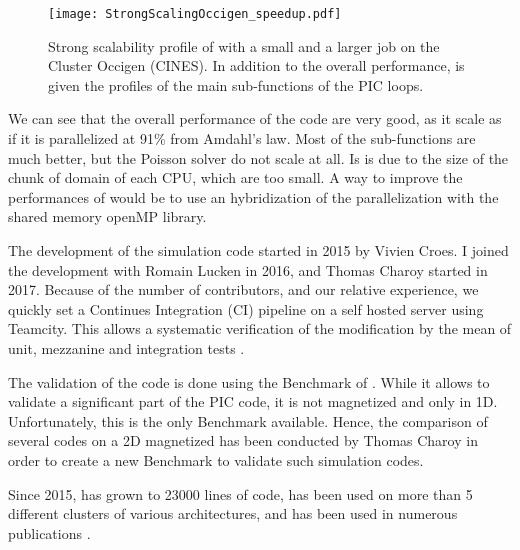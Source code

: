 \begin{figure}[hbtp]
  \centering
  \texttt{[image: StrongScalingOccigen\_speedup.pdf]}
  \caption{Strong scalability profile of \LPPic with a small and a larger job on the Cluster Occigen (CINES). In addition to the overall performance, is given the profiles of the main sub-functions of the \ac{PIC} loops. }
  \label{fig-strongperfo}
\end{figure}

We can see that the overall performance of the code are very good, as it scale as if it is parallelized at 91\% from Amdahl's law.
Most of the sub-functions are much better, but the Poisson solver do not scale at all.
Is is due to the size of the chunk of domain of each CPU, which are too small.
A way to improve the performances of \LPPic would be to use an hybridization of the parallelization with the shared memory openMP library.

The development of the  simulation code \LPPic started in 2015 by Vivien Croes.
I joined the development with Romain Lucken in 2016, and Thomas Charoy started in 2017.
Because of the number of contributors, and our relative experience, we quickly set a Continues Integration (CI) pipeline on a self hosted server using Teamcity.
This allows a systematic verification of the modification by the mean of unit, mezzanine and integration tests \citep{turner2016}.

The validation of the code is done using the Benchmark of \citet{turner2013}.
While it allows to validate a significant part of the \ac{PIC} code, it is not magnetized and only in \ac{1D}.
Unfortunately, this is the only Benchmark available.
Hence, the comparison of several codes on a \ac{2D} magnetized  has been conducted by Thomas Charoy in order to create a new Benchmark to validate such simulation codes.

Since 2015, \LPPic has grown to 23000 lines of code, has been used on more than 5 different clusters of various architectures, and has been used in numerous publications \citep{croes2017a,croes2018,tavant2018,tavant2019,lucken2018,lucken2019}.
